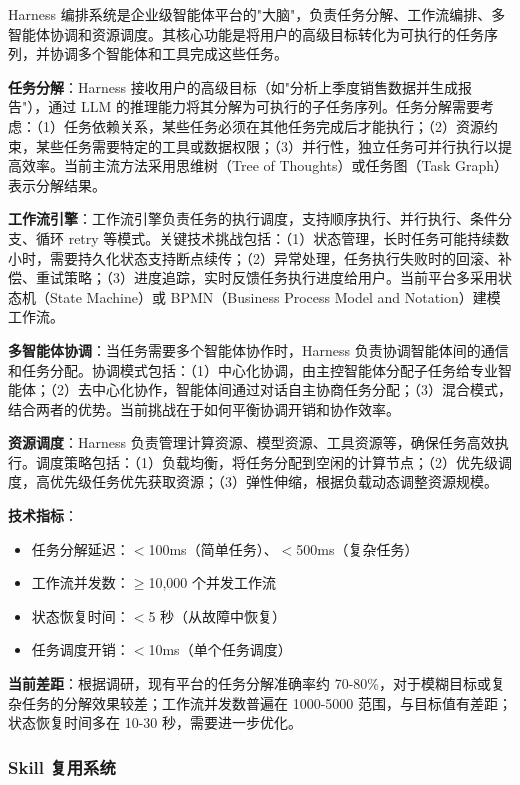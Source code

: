 \documentclass[12pt,a4paper]{article}
\begin{document}
Harness 编排系统是企业级智能体平台的"大脑"，负责任务分解、工作流编排、多智能体协调和资源调度。其核心功能是将用户的高级目标转化为可执行的任务序列，并协调多个智能体和工具完成这些任务。

\textbf{任务分解}：Harness 接收用户的高级目标（如"分析上季度销售数据并生成报告"），通过 LLM 的推理能力将其分解为可执行的子任务序列。任务分解需要考虑：（1）任务依赖关系，某些任务必须在其他任务完成后才能执行；（2）资源约束，某些任务需要特定的工具或数据权限；（3）并行性，独立任务可并行执行以提高效率。当前主流方法采用思维树（Tree of Thoughts）或任务图（Task Graph）表示分解结果。

\textbf{工作流引擎}：工作流引擎负责任务的执行调度，支持顺序执行、并行执行、条件分支、循环 retry 等模式。关键技术挑战包括：（1）状态管理，长时任务可能持续数小时，需要持久化状态支持断点续传；（2）异常处理，任务执行失败时的回滚、补偿、重试策略；（3）进度追踪，实时反馈任务执行进度给用户。当前平台多采用状态机（State Machine）或 BPMN（Business Process Model and Notation）建模工作流。

\textbf{多智能体协调}：当任务需要多个智能体协作时，Harness 负责协调智能体间的通信和任务分配。协调模式包括：（1）中心化协调，由主控智能体分配子任务给专业智能体；（2）去中心化协作，智能体间通过对话自主协商任务分配；（3）混合模式，结合两者的优势。当前挑战在于如何平衡协调开销和协作效率。

\textbf{资源调度}：Harness 负责管理计算资源、模型资源、工具资源等，确保任务高效执行。调度策略包括：（1）负载均衡，将任务分配到空闲的计算节点；（2）优先级调度，高优先级任务优先获取资源；（3）弹性伸缩，根据负载动态调整资源规模。

\textbf{技术指标}：
\begin{itemize}
    \item 任务分解延迟：$<$100ms（简单任务）、$<$500ms（复杂任务）
    \item 工作流并发数：$\geq$10,000 个并发工作流
    \item 状态恢复时间：$<$5 秒（从故障中恢复）
    \item 任务调度开销：$<$10ms（单个任务调度）
\end{itemize}

\textbf{当前差距}：根据调研，现有平台的任务分解准确率约 70-80\%，对于模糊目标或复杂任务的分解效果较差；工作流并发数普遍在 1000-5000 范围，与目标值有差距；状态恢复时间多在 10-30 秒，需要进一步优化。

\subsubsection{Skill 复用系统}
\end{document}
